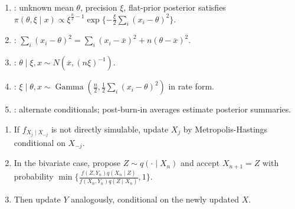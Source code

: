 \begin{method} \label{meth:gibbs-sampling-normal-mean-precision} 
\begin{enumerate}[label=(\roman*)]
\setlength{\itemsep}{0pt}
\item {}: unknown mean $\theta$, precision $\xi$, flat-prior posterior satisfies $\pi(\theta,\xi\mid x)\propto\xi^{\frac{n}{2}-1}\exp\{-\frac{\xi}{2}\sum\limits_i(x_i-\theta)^2\}$.
\item {}: $\sum\limits_i(x_i-\theta)^2=\sum\limits_i(x_i-\overline{x})^2+n(\theta-\overline{x})^2$.
\item {}: $\theta\mid\xi,x\sim N(\overline{x},(n\xi)^{-1})$.
\item {}: $\xi\mid\theta,x\sim\operatorname{Gamma}(\frac{n}{2},\frac12\sum\limits_i(x_i-\theta)^2)$ in rate form.
\item {}: alternate conditionals; post-burn-in averages estimate posterior summaries.
\end{enumerate}
\end{method}

\begin{method} \label{method:metropolis-within-gibbs} 
\begin{enumerate}[label=(\roman*)]
\setlength{\itemsep}{0pt}
\item If $f_{X_j\mid X_{-j}}$ is not directly simulable, update $X_j$ by Metropolis-Hastings conditional on $X_{-j}$.
\item In the bivariate case, propose $Z\sim q(\cdot\mid X_n)$ and accept $X_{n+1}=Z$ with probability $\min\{\frac{f(Z,Y_n)q(X_n\mid Z)}{f(X_n,Y_n)q(Z\mid X_n)},1\}$.
\item Then update $Y$ analogously, conditional on the newly updated $X$.
\end{enumerate}
\end{method}

